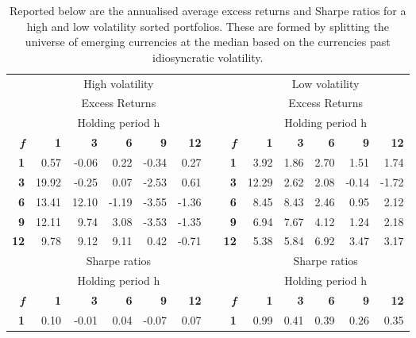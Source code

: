 \documentclass{article}
\begin{document}
\begin{table}[htbp]
  \centering
  \caption{Reported below are the annualised average excess returns and Sharpe ratios for a high and low volatility sorted portfolios. These are formed by splitting the universe of emerging currencies at the median based on the currencies past idiosyncratic volatility.}
    \begin{tabular}{rrrrrrrrrrrrr}
    \toprule
          & \multicolumn{5}{c}{High volatility}   &       &       & \multicolumn{5}{c}{Low volatility} \\
          & \multicolumn{5}{c}{Excess Returns}    &       &       & \multicolumn{5}{c}{Excess Returns} \\
\cmidrule{2-6}\cmidrule{9-13}          & \multicolumn{5}{c}{Holding period h}  &       &       & \multicolumn{5}{c}{Holding period h} \\
    \textit{\textbf{f}} & \textbf{1} & \textbf{3} & \textbf{6} & \textbf{9} & \textbf{12} &       & \textit{\textbf{f}} & \textbf{1} & \textbf{3} & \textbf{6} & \textbf{9} & \textbf{12} \\
\cmidrule{2-6}\cmidrule{9-13}    \textbf{1} & 0.57  & -0.06 & 0.22  & -0.34 & 0.27  &       & \textbf{1} & 3.92  & 1.86  & 2.70  & 1.51  & 1.74 \\
    \textbf{3} & 19.92 & -0.25 & 0.07  & -2.53 & 0.61  &       & \textbf{3} & 12.29 & 2.62  & 2.08  & -0.14 & -1.72 \\
    \textbf{6} & 13.41 & 12.10 & -1.19 & -3.55 & -1.36 &       & \textbf{6} & 8.45  & 8.43  & 2.46  & 0.95  & 2.12 \\
    \textbf{9} & 12.11 & 9.74  & 3.08  & -3.53 & -1.35 &       & \textbf{9} & 6.94  & 7.67  & 4.12  & 1.24  & 2.18 \\
    \textbf{12} & 9.78  & 9.12  & 9.11  & 0.42  & -0.71 &       & \textbf{12} & 5.38  & 5.84  & 6.92  & 3.47  & 3.17 \\
    \midrule
          & \multicolumn{5}{c}{Sharpe ratios}     &       &       & \multicolumn{5}{c}{Sharpe ratios} \\
    \midrule
          & \multicolumn{5}{c}{Holding period h}  &       &       & \multicolumn{5}{c}{Holding period h} \\
    \textit{\textbf{f}} & \textbf{1} & \textbf{3} & \textbf{6} & \textbf{9} & \textbf{12} &       & \textit{\textbf{f}} & \textbf{1} & \textbf{3} & \textbf{6} & \textbf{9} & \textbf{12} \\
\cmidrule{2-6}\cmidrule{9-13}    \textbf{1} & 0.10  & -0.01 & 0.04  & -0.07 & 0.07  &       & \textbf{1} & 0.99  & 0.41  & 0.39  & 0.26  & 0.35 \\

\end{tabular}
\end{table}
\end{document}
